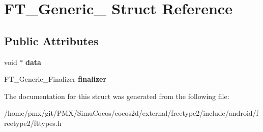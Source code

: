 \hypertarget{structFT__Generic__}{}\section{F\+T\+\_\+\+Generic\+\_\+ Struct Reference}
\label{structFT__Generic__}
\subsection*{Public Attributes}
\begin{DoxyCompactItemize}
\item 
\mbox{\label{structFT__Generic___af611c24faad2c3937831498aabfcdff7}} 
void $\ast$ {\bfseries data}
\item 
\mbox{\label{structFT__Generic___a20fce8de90cc9e3876935817247b9ccc}} 
F\+T\+\_\+\+Generic\+\_\+\+Finalizer {\bfseries finalizer}
\end{DoxyCompactItemize}


The documentation for this struct was generated from the following file\+:\begin{DoxyCompactItemize}
\item 
/home/pmx/git/\+P\+M\+X/\+Simu\+Cocos/cocos2d/external/freetype2/include/android/freetype2/fttypes.\+h\end{DoxyCompactItemize}
